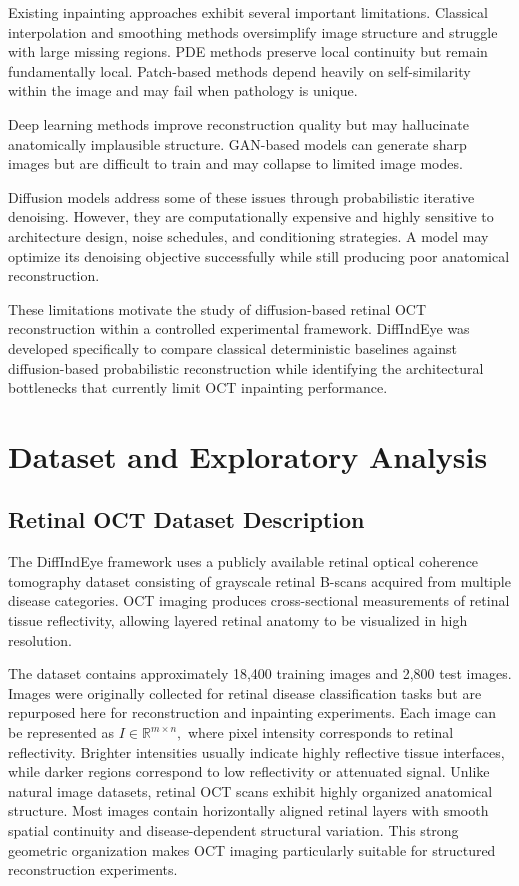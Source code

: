 \documentclass[12pt,oneside]{article}
\newcommand{\R}{\mathbb{R}}
\begin{document}
Existing inpainting approaches exhibit several important limitations. Classical interpolation and smoothing methods oversimplify image structure and struggle with large missing regions. PDE methods preserve local continuity but remain fundamentally local. Patch-based methods depend heavily on self-similarity within the image and may fail when pathology is unique.

Deep learning methods improve reconstruction quality but may hallucinate anatomically implausible structure. GAN-based models can generate sharp images but are difficult to train and may collapse to limited image modes.

Diffusion models address some of these issues through probabilistic iterative denoising. However, they are computationally expensive and highly sensitive to architecture design, noise schedules, and conditioning strategies. A model may optimize its denoising objective successfully while still producing poor anatomical reconstruction.

These limitations motivate the study of diffusion-based retinal OCT reconstruction within a controlled experimental framework. DiffIndEye was developed specifically to compare classical deterministic baselines against diffusion-based probabilistic reconstruction while identifying the architectural bottlenecks that currently limit OCT inpainting performance.


\section{Dataset and Exploratory Analysis}

\subsection{Retinal OCT Dataset Description}

The DiffIndEye framework uses a publicly available retinal optical coherence tomography dataset consisting of grayscale retinal B-scans acquired from multiple disease categories. OCT imaging produces cross-sectional measurements of retinal tissue reflectivity, allowing layered retinal anatomy to be visualized in high resolution.

The dataset contains approximately 18,400 training images and 2,800 test images. Images were originally collected for retinal disease classification tasks but are repurposed here for reconstruction and inpainting experiments.
Each image can be represented as \(I \in \R^{m \times n},\)
where pixel intensity corresponds to retinal reflectivity. Brighter intensities usually indicate highly reflective tissue interfaces, while darker regions correspond to low reflectivity or attenuated signal.
Unlike natural image datasets, retinal OCT scans exhibit highly organized anatomical structure. Most images contain horizontally aligned retinal layers with smooth spatial continuity and disease-dependent structural variation. This strong geometric organization makes OCT imaging particularly suitable for structured reconstruction experiments.
\end{document}
